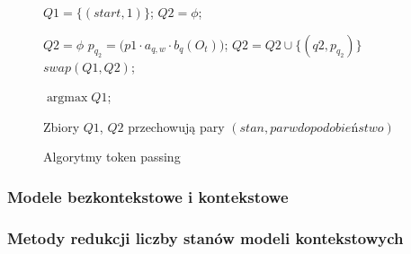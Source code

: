\documentclass[11pt]{article}
\DeclareMathOperator*{\argmax}{\arg\max}   %
\begin{document}
		    \begin{figure}
		    	\begin{algorithmic}[1]
		    		
		    		
		    		\STATE $Q1 = \{(start, 1)\}$; 
		    		\STATE $Q2 = \phi$;		    
		    		
			    		\STATE $Q2 = \phi$
					    		\STATE $p_{q_2} = \bigg( p1\cdot a_{q,w}\cdot b_q(O_t) \label{line:b_q} \bigg)$;				    	
					    		\STATE $Q2 = Q2 \cup \{(q2, p_{q_2})\}$
				    		\ENDFOR
			    		\ENDFOR
			    		\STATE $swap(Q1, Q2)$;
		    		\ENDFOR
		    		
		    		\RETURN $\argmax{Q1}$;
		    	\end{algorithmic}
	    	
		    	Zbiory $Q1$, $Q2$ przechowują pary $(stan, parwdopodobieństwo)$ 
		    	
		    	\caption{Algorytmy token passing}
		    	\label{alg:token_passing}
		    \end{figure}		
		    
		    
       \subsubsection{ Modele bezkontekstowe i kontekstowe}
       \subsubsection{ Metody redukcji liczby stanów modeli kontekstowych }	
       \label{sec:state_red}
\end{document}
